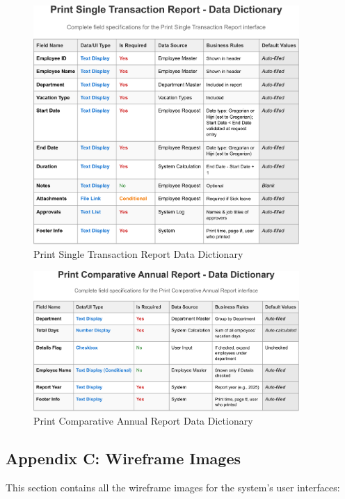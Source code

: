 \documentclass[12pt,a4paper]{article}
\begin{document}
\begin{figure}[H]
\centering
\includegraphics[width=0.9\textwidth]{Data-Dictionary/Screen-Data-Dictionaries/Print-Single-Transaction-Report-Data-Dictionary/Print-Single-Transaction-Report-Data-Dictionary-1.png}
\caption{Print Single Transaction Report Data Dictionary}
\label{fig:print-single-transaction-data-dict}
\end{figure}

\begin{figure}[H]
\centering
\includegraphics[width=0.9\textwidth]{Data-Dictionary/Screen-Data-Dictionaries/Print-Comparative-Annual-Report-Data-Dictionary/Print-Comparative-Annual-Report-Data-Dictionary-1.png}
\caption{Print Comparative Annual Report Data Dictionary}
\label{fig:print-comparative-annual-data-dict}
\end{figure}

\subsection{Appendix C: Wireframe Images}
This section contains all the wireframe images for the system's user interfaces:
\end{document}
